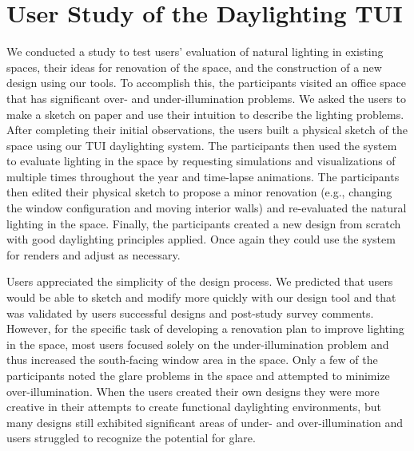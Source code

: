 \documentclass[10pt,twocolumn,letterpaper]{article}
\begin{document}

\section{User Study of the Daylighting TUI}

We conducted a study to test users' evaluation of natural
lighting in existing spaces, their ideas for renovation of the space,
and the construction of a new design using our tools.  To accomplish
this, the participants visited an office space that has significant
over- and under-illumination problems.  We asked the users to make a
sketch on paper and use their intuition to describe the lighting
problems.
%
After completing their initial observations, the users built a
physical sketch of the space using our TUI daylighting system.  The
participants then used the system to evaluate lighting in the space by
requesting simulations and visualizations of multiple times throughout
the year and time-lapse animations.
%
The participants then edited their physical sketch to 
propose a minor renovation (e.g., changing the window configuration
and moving interior walls) and re-evaluated the natural lighting in
the space.
%
Finally, the participants
created a new design from scratch with good daylighting principles
applied.  Once again they could use the system for renders and adjust
as necessary.

Users appreciated the simplicity of the design process.  We predicted
that users would be able to sketch and modify more quickly with our
design tool and that was validated by users successful designs and
post-study survey comments.
%
However, for the specific task of developing a renovation plan to
improve lighting in the space, most users focused solely on the
under-illumination problem and thus increased the south-facing window
area in the space. 
%
%
Only a few of the participants noted the glare problems in the space
and attempted to minimize over-illumination.
%
When the users created their own designs they were more creative in
their attempts to create functional daylighting environments, but many
designs still exhibited significant areas of under- and
over-illumination and users struggled to recognize the potential for
glare.
\end{document}
